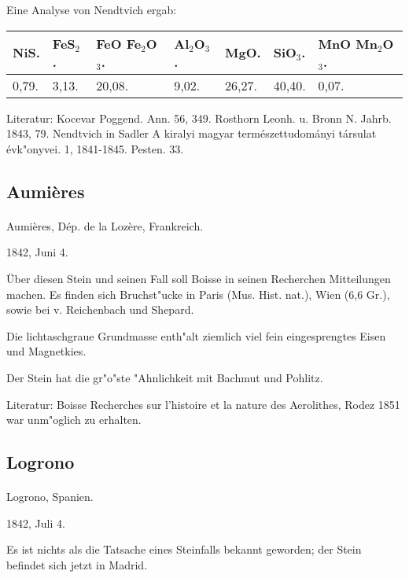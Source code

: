 \documentclass[a4paper, 11pt, oneside]{article}
\begin{document}
Eine Analyse von Nendtvich ergab:
\begin{table}[!ht]
    \centering
    \footnotesize
    \begin{tabular}{l l l l l l l}
        NiS. & FeS$_{2}$. & FeO Fe$_{2}$O$_{3}$. & Al$_{2}$O$_{3}$. & MgO. & SiO$_{3}$. & MnO Mn$_{2}$O$_{3}$. \\ \hline
        0,79. & 3,13. & 20,08. & 9,02. & 26,27. & 40,40. & 0,07. \\
    \end{tabular}
\end{table}

\footnotesize
Literatur: Kocevar Poggend. Ann. 56, 349. Rosthorn Leonh. u. Bronn N. Jahrb. 1843, 79. Nendtvich in Sadler A kiralyi magyar természettudományi társulat évk"onyvei. 1, 1841-1845. Pesten. 33.

\subsection{Aumières}
\normalsize
\paragraph{}
Aumières, Dép. de la Lozère, Frankreich.

1842, Juni 4.

Über diesen Stein und seinen Fall soll Boisse in seinen Recherchen Mitteilungen machen. Es finden sich Bruchst"ucke in Paris (Mus. Hist. nat.), Wien (6,6 Gr.), sowie bei v. Reichenbach und Shepard.

Die lichtaschgraue Grundmasse enth"alt ziemlich viel fein eingesprengtes Eisen und Magnetkies.

Der Stein hat die gr"o"ste "Ahnlichkeit mit Bachmut und Pohlitz.

\footnotesize
Literatur: Boisse Recherches sur l'histoire et la nature des Aerolithes, Rodez 1851 war unm"oglich zu erhalten.

\subsection{Logrono}
\normalsize
\paragraph{}
Logrono, Spanien.

1842, Juli 4.

Es ist nichts als die Tatsache eines Steinfalls bekannt geworden; der Stein befindet sich jetzt in Madrid.
\end{document}
